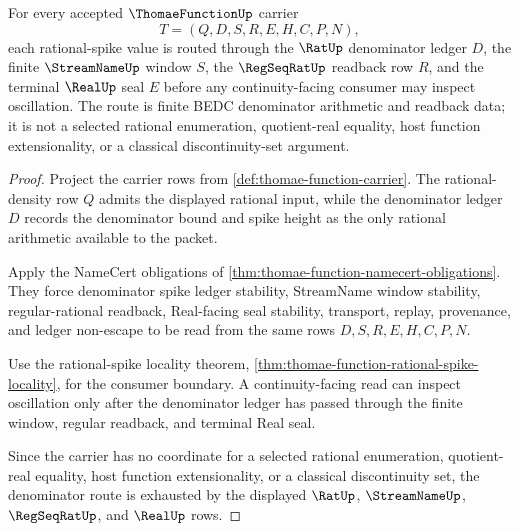 \begin{theorem}
\label{thm:thomae-function-rational-denominator-route}
For every accepted $\ThomaeFunctionUp$ carrier
$$
T=(Q,D,S,R,E,H,C,P,N),
$$
each rational-spike value is routed through the $\RatUp$ denominator ledger $D$, the finite $\StreamNameUp$ window $S$, the $\RegSeqRatUp$ readback row $R$, and the terminal $\RealUp$ seal $E$ before any continuity-facing consumer may inspect oscillation. The route is finite BEDC denominator arithmetic and readback data; it is not a selected rational enumeration, quotient-real equality, host function extensionality, or a classical discontinuity-set argument.
\end{theorem}
\begin{proof}
Project the carrier rows from \autoref{def:thomae-function-carrier}. The rational-density row $Q$ admits the displayed rational input, while the denominator ledger $D$ records the denominator bound and spike height as the only rational arithmetic available to the packet.

Apply the NameCert obligations of \autoref{thm:thomae-function-namecert-obligations}. They force denominator spike ledger stability, StreamName window stability, regular-rational readback, Real-facing seal stability, transport, replay, provenance, and ledger non-escape to be read from the same rows $D,S,R,E,H,C,P,N$.

Use the rational-spike locality theorem, \autoref{thm:thomae-function-rational-spike-locality}, for the consumer boundary. A continuity-facing read can inspect oscillation only after the denominator ledger has passed through the finite window, regular readback, and terminal Real seal.

Since the carrier has no coordinate for a selected rational enumeration, quotient-real equality, host function extensionality, or a classical discontinuity set, the denominator route is exhausted by the displayed $\RatUp$, $\StreamNameUp$, $\RegSeqRatUp$, and $\RealUp$ rows.
\end{proof}


